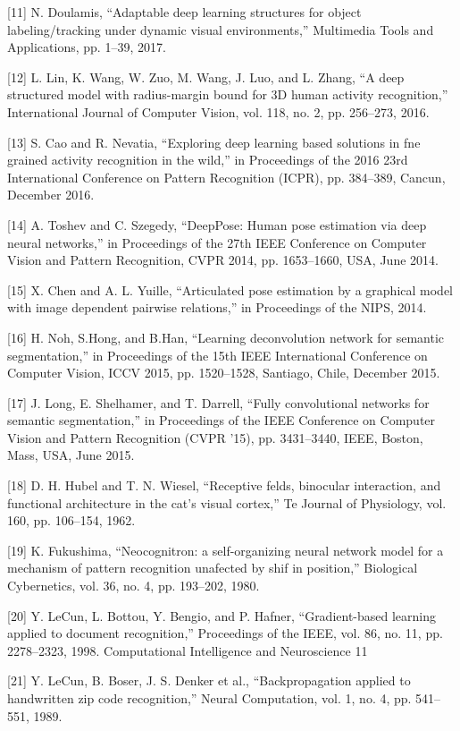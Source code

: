 \documentclass[a4paper]{article}
\begin{document}
[11] N. Doulamis, “Adaptable deep learning structures for object
labeling/tracking under dynamic visual environments,” Multimedia Tools and Applications, pp. 1–39, 2017.


[12] L. Lin, K. Wang, W. Zuo, M. Wang, J. Luo, and L. Zhang, “A deep
structured model with radius-margin bound for 3D human
activity recognition,” International Journal of Computer Vision,
vol. 118, no. 2, pp. 256–273, 2016.


[13] S. Cao and R. Nevatia, “Exploring deep learning based solutions
in fne grained activity recognition in the wild,” in Proceedings
of the 2016 23rd International Conference on Pattern Recognition
(ICPR), pp. 384–389, Cancun, December 2016.


[14] A. Toshev and C. Szegedy, “DeepPose: Human pose estimation
via deep neural networks,” in Proceedings of the 27th IEEE
Conference on Computer Vision and Pattern Recognition, CVPR
2014, pp. 1653–1660, USA, June 2014.


[15] X. Chen and A. L. Yuille, “Articulated pose estimation by a
graphical model with image dependent pairwise relations,” in
Proceedings of the NIPS, 2014.


[16] H. Noh, S.Hong, and B.Han, “Learning deconvolution network
for semantic segmentation,” in Proceedings of the 15th IEEE
International Conference on Computer Vision, ICCV 2015, pp.
1520–1528, Santiago, Chile, December 2015.


[17] J. Long, E. Shelhamer, and T. Darrell, “Fully convolutional networks for semantic segmentation,” in Proceedings of the IEEE
Conference on Computer Vision and Pattern Recognition (CVPR
’15), pp. 3431–3440, IEEE, Boston, Mass, USA, June 2015.


[18] D. H. Hubel and T. N. Wiesel, “Receptive felds, binocular
interaction, and functional architecture in the cat’s visual
cortex,” Te Journal of Physiology, vol. 160, pp. 106–154, 1962.


[19] K. Fukushima, “Neocognitron: a self-organizing neural network model for a mechanism of pattern recognition unafected
by shif in position,” Biological Cybernetics, vol. 36, no. 4, pp.
193–202, 1980.


[20] Y. LeCun, L. Bottou, Y. Bengio, and P. Hafner, “Gradient-based
learning applied to document recognition,” Proceedings of the
IEEE, vol. 86, no. 11, pp. 2278–2323, 1998.
Computational Intelligence and Neuroscience 11


	[21] Y. LeCun, B. Boser, J. S. Denker et al., “Backpropagation applied
to handwritten zip code recognition,” Neural Computation, vol.
1, no. 4, pp. 541–551, 1989.
\end{document}
